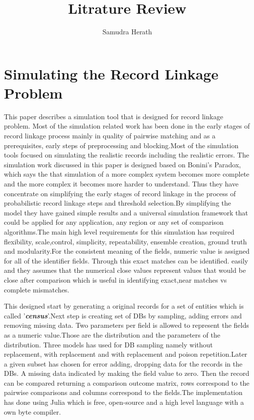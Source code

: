 \documentclass[a4paper]{article}
\title{Litrature Review}
\author{Samudra Herath}
\begin{document}
\maketitle

\section*{Simulating the Record Linkage Problem}
This paper describes a simulation tool that is designed for record linkage problem. Most of the simulation related work has been done in the early stages of record linkage process mainly in quality of pairwise matching and as a prerequisites, early steps of preprocessing and blocking.Most of the simulation tools focused on simulating the realistic records including the realistic errors. The simulation work discussed in this paper is designed based on Bonini's Paradox, which says the that simulation of a more complex system becomes more complete and the more complex it becomes more harder to understand. Thus they have concentrate on simplifying the early stages of record linkage in the process of probabilistic record linkage steps and threshold selection.By simplifying the model they have gained simple results and a universal simulation framework that could be applied for any application, any region or any set of comparison algorithms.The main high level requirements for this simulation has required flexibility, scale,control, simplicity, repeatability, ensemble creation, ground truth and modularity.For the consistent meaning of the fields, numeric value is assigned for all of the identifier fields.
Through this exact matches can be identified. easily and they assumes that the numerical close values represent values that would be close after comparison which is useful in identifying exact,near matches vs complete mismatches.

This designed start by generating a original records for a set of entities which is called '\textbf{\textit{census}}'.Next step is creating set of DBs by sampling, adding errors and removing missing data. Two parameters per field is allowed to represent the fields as a numeric value.Those are the distribution and the parameters of the distribution. Three models has used for DB sampling namely without replacement, with replacement and with replacement and poison repetition.Later a given subset has chosen for error adding, dropping data for the records in the DBs. A missing data indicated by making the field value to zero. Then the record can be compared returning a comparison outcome matrix, rows correspond to the pairwise comparisons and columns correspond to the fields.The implementation has done using Julia which is free, open-source and a high level language with a own byte compiler.
\end{document}
